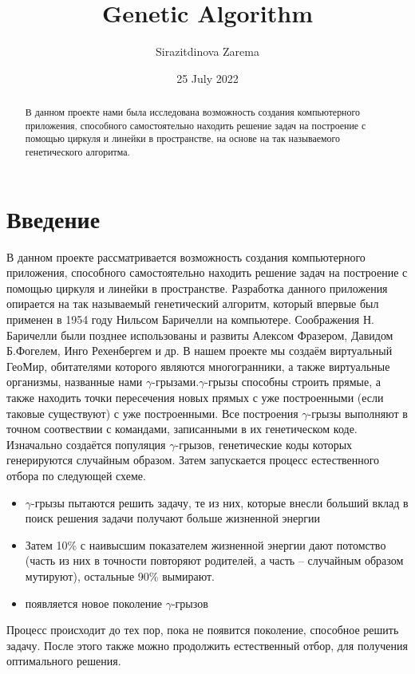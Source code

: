 \documentclass[a4paper,12pt]{article}
\title{Genetic Algorithm}
\author{Sirazitdinova Zarema}
\date{25 July 2022}
\theoremstyle{plain} %
\numberwithin{equation}{section}
\theoremstyle{definition} %
\theoremstyle{remark} %
\begin{document}
\large
\maketitle
\tableofcontents
\begin{abstract}
\large
В данном проекте\cite{myers2011art} нами была исследована возможность создания компьютерного приложения, способного самостоятельно находить решение задач на построение с помощью циркуля и линейки в пространстве, на основе на так называемого генетического алгоритма.
\end{abstract}
\section{Введение}
В данном проекте рассматривается возможность создания компьютерного приложения, способного самостоятельно находить решение задач на построение с помощью циркуля и линейки в пространстве.  Разработка данного приложения опирается на так называемый генетический алгоритм, который впервые был применен в 1954 году Нильсом Баричелли на компьютере. Соображения Н. Баричелли были позднее использованы и развиты Алексом Фразером, Давидом Б.Фогелем, Инго Рехенбергем и др. 
В нашем проекте мы создаём виртуальный ГеоМир, обитателями которого являются многогранники, а также виртуальные организмы, названные нами $\gamma$-грызами.$\gamma$-грызы способны строить прямые, а также находить точки пересечения новых прямых с уже построенными (если таковые существуют) с уже построенными. Все построения $\gamma$-грызы выполняют в точном соотвествии с командами, записанными в их генетическом коде.
Изначально создаётся популяция $\gamma$-грызов, генетические коды которых генерируются случайным образом. Затем запускается процесс естественного отбора по следующей схеме.
\begin{itemize}
    \item $\gamma$-грызы пытаются решить задачу, те из них, которые внесли больший вклад в поиск решения задачи получают больше жизненной энергии
    \item  Затем 10\% с наивысшим показателем жизненной энергии дают потомство (часть из них в точности повторяют родителей, а часть – случайным образом мутируют), остальные 90\% вымирают.
    \item появляется новое поколение $\gamma$-грызов
\end{itemize}
 Процесс происходит до тех пор, пока не появится поколение, способное решить задачу. После этого также можно продолжить естественный отбор, для получения оптимального решения.
\end{document}

